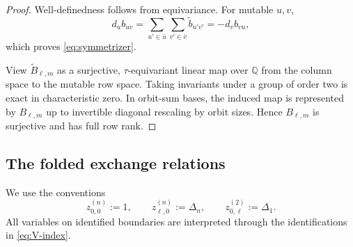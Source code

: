 \documentclass[11pt]{amsart}
\theoremstyle{definition}
\theoremstyle{remark}
\begin{document}
\begin{proof}
Well-definedness follows from equivariance.  For mutable $u,v$,
\[ d_ub_{uv} =\sum_{u'\in\bar u}\sum_{v'\in\bar v} \widetilde b_{u'v'} =-d_vb_{vu}, \]
which proves \eqref{eq:symmetrizer}.

View $\widetilde B_{\ell,m}$ as a surjective, $\tau$-equivariant linear map
over $\mathbb Q$ from the column space to the mutable row space.  Taking
invariants under a group of order two is exact in characteristic zero.  In
orbit-sum bases, the induced map is represented by $B_{\ell,m}$ up to
invertible diagonal rescaling by orbit sizes.  Hence $B_{\ell,m}$ is
surjective and has full row rank.
\end{proof}

\subsection{The folded exchange relations}
\label{subsec:folded-relations}

We use the conventions
\[ z_{0,0}^{(n)}:=1, \qquad z_{\ell,0}^{(n)}:=\Delta_n, \qquad z_{0,\ell}^{(2)}:=\Delta_1. \]
All variables on identified boundaries are interpreted through the identifications in
\eqref{eq:V-index}.
\end{document}
